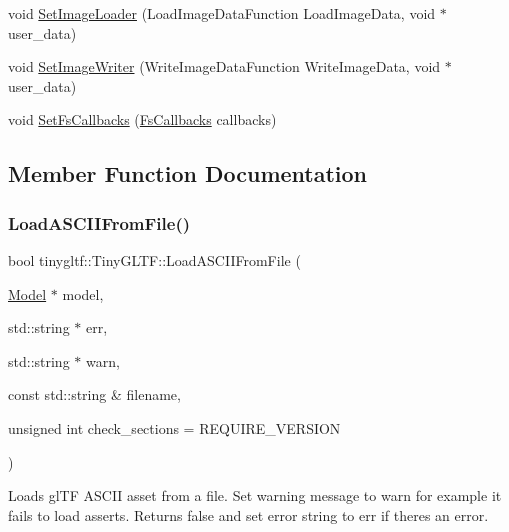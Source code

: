 \begin{DoxyCompactItemize}
\item 
void \hyperlink{classtinygltf_1_1TinyGLTF_a2db832bfff9de2c8612a35c823ba91b8}{Set\+Image\+Loader} (Load\+Image\+Data\+Function Load\+Image\+Data, void $\ast$user\+\_\+data)
\item 
void \hyperlink{classtinygltf_1_1TinyGLTF_a5c98eaf13689129e47d9f31c6487fcdd}{Set\+Image\+Writer} (Write\+Image\+Data\+Function Write\+Image\+Data, void $\ast$user\+\_\+data)
\item 
void \hyperlink{classtinygltf_1_1TinyGLTF_a92551e51e5c2ef62545accbdf3055e3d}{Set\+Fs\+Callbacks} (\hyperlink{structtinygltf_1_1FsCallbacks}{Fs\+Callbacks} callbacks)
\end{DoxyCompactItemize}


\subsection{Member Function Documentation}
\mbox{\label{classtinygltf_1_1TinyGLTF_afb694767274be3674f6e98ad2e32ffa8}} 
\subsubsection{\texorpdfstring{Load\+A\+S\+C\+I\+I\+From\+File()}{LoadASCIIFromFile()}}
{\footnotesize\ttfamily bool tinygltf\+::\+Tiny\+G\+L\+T\+F\+::\+Load\+A\+S\+C\+I\+I\+From\+File (\begin{DoxyParamCaption}\item[{\hyperlink{classtinygltf_1_1Model}{Model} $\ast$}]{model,  }\item[{std\+::string $\ast$}]{err,  }\item[{std\+::string $\ast$}]{warn,  }\item[{const std\+::string \&}]{filename,  }\item[{unsigned int}]{check\+\_\+sections = {\ttfamily REQUIRE\+\_\+VERSION} }\end{DoxyParamCaption})}

Loads gl\+TF A\+S\+C\+II asset from a file. Set warning message to {\ttfamily warn} for example it fails to load asserts. Returns false and set error string to {\ttfamily err} if there\textquotesingle{}s an error. \mbox{\label{classtinygltf_1_1TinyGLTF_a868ceaa7231473720375cfe47ba26840}} 
